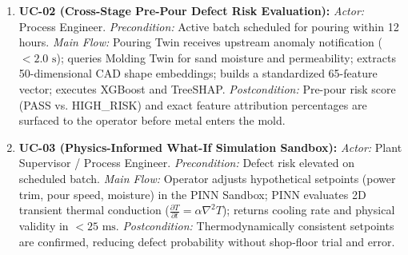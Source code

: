 \documentclass[11pt, a4paper]{article}
\begin{document}
\begin{itemize}[noitemsep, topsep=2pt]
\begin{enumerate}[noitemsep, topsep=2pt]
        \item \textbf{UC-02 (Cross-Stage Pre-Pour Defect Risk Evaluation):} \textit{Actor:} Process Engineer. \textit{Precondition:} Active batch scheduled for pouring within 12 hours. \textit{Main Flow:} Pouring Twin receives upstream anomaly notification ($<2.0\text{ s}$); queries Molding Twin for sand moisture and permeability; extracts 50-dimensional CAD shape embeddings; builds a standardized 65-feature vector; executes XGBoost and TreeSHAP. \textit{Postcondition:} Pre-pour risk score (PASS vs. HIGH\_RISK) and exact feature attribution percentages are surfaced to the operator before metal enters the mold.
        \item \textbf{UC-03 (Physics-Informed What-If Simulation Sandbox):} \textit{Actor:} Plant Supervisor / Process Engineer. \textit{Precondition:} Defect risk elevated on scheduled batch. \textit{Main Flow:} Operator adjusts hypothetical setpoints (power trim, pour speed, moisture) in the PINN Sandbox; PINN evaluates 2D transient thermal conduction ($\frac{\partial T}{\partial t} = \alpha \nabla^2 T$); returns cooling rate and physical validity in $<25\text{ ms}$. \textit{Postcondition:} Thermodynamically consistent setpoints are confirmed, reducing defect probability without shop-floor trial and error.
    \end{enumerate}
\end{itemize}
\end{document}
